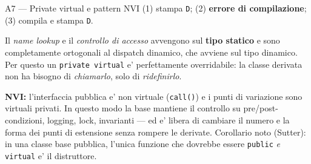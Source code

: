 \documentclass{report}
\newcommand{\code}[1]{\texttt{\small #1}}
\begin{document}
\begin{soluzione}{A7 --- Private virtual e pattern NVI}
\label{sol:A7}
(1) stampa \code{D}; \quad (2) \textbf{errore di compilazione}; \quad
(3) compila e stampa \code{D}.

Il \emph{name lookup} e il \emph{controllo di accesso} avvengono sul
\textbf{tipo statico} e sono completamente ortogonali al dispatch dinamico, che
avviene sul tipo dinamico. Per questo un \code{private virtual} e'
perfettamente overridabile: la classe derivata non ha bisogno di
\emph{chiamarlo}, solo di \emph{ridefinirlo}.

\textbf{NVI:} l'interfaccia pubblica e' non virtuale (\code{call()}) e i punti
di variazione sono virtuali privati. In questo modo la base mantiene il
controllo su pre/post-condizioni, logging, lock, invarianti --- ed e' libera di
cambiare il numero e la forma dei punti di estensione senza rompere le
derivate. Corollario noto (Sutter): in una classe base pubblica, l'unica
funzione che dovrebbe essere \code{public} \emph{e} \code{virtual} e' il
distruttore.
\end{soluzione}
\end{document}
